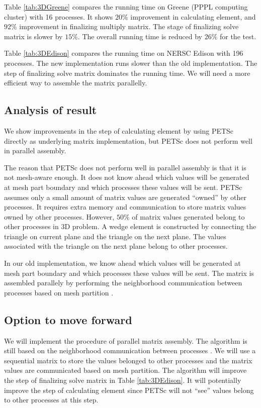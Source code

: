 \documentclass[11pt]{article}  %
\begin{document}
Table \ref{tab:3DGreene} compares the running time on Greene (PPPL computing cluster) with 16 processes. It shows $20\%$ improvement in calculating element, and $92\%$ improvement in finalizing multiply matrix. The stage of finalizing solve matrix is slower by $15\%$. The overall running time is reduced by $26\%$ for the test.

Table \ref{tab:3DEdison} compares the running time on NERSC Edison with 196 processes. The new implementation runs slower than the old implementation. The step of finalizing solve matrix dominates the running time. We will need a more efficient way to assemble  the matrix parallelly.

\subsection{Analysis of result}
We show improvements in the step of calculating element by using PETSc directly as underlying matrix implementation, but PETSc does not perform well in parallel assembly.

The reason that PETSc does not perform well in parallel assembly is that it is not mesh-aware enough. It does not know ahead which values will be generated at mesh part boundary and which processes these values will be sent. PETSc assumes only a small amount of matrix values are generated ``owned'' by other processes. It requires extra memory and communication to store matrix values owned by other processes. However, $50\%$ of matrix values generated belong to other processes in 3D problem. A wedge element is constructed by connecting the triangle on current plane and the triangle on the next plane. The values associated with the triangle on the next plane belong to other processes.

In our old implementation,  we know ahead  which values will be generated at mesh part boundary and which processes these values will be sent. The matrix is assembled parallely by performing the neighborhood communication between processes based on mesh partition \cite{sahni2009strong,ovcharenko2012neighborhood}.

\subsection{Option to move forward}
We will implement the procedure of parallel matrix assembly. The algorithm is still based on the neighborhood communication between processes \cite{sahni2009strong,ovcharenko2012neighborhood}.  We will use a sequential matrix to store the values belonged to other processes and the matrix values are communicated based on mesh partition.  The algorithm will improve the step of  finalizing solve matrix in Table \ref{tab:3DEdison}. It will potentially improve the step of calculating element since PETSc will not ``see'' values belong to other processes at this step. 




\end{document}
